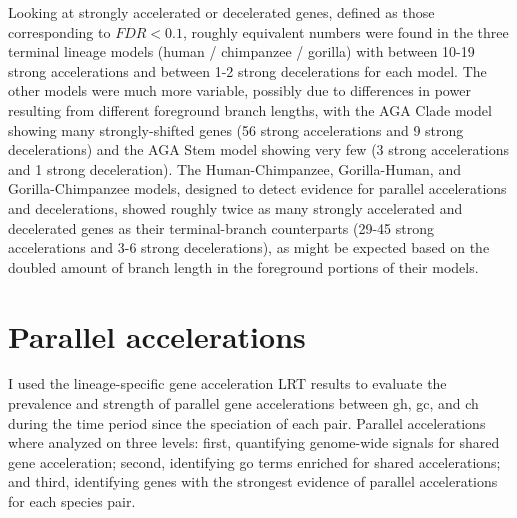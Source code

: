 Looking at strongly accelerated or decelerated genes, defined as those
corresponding to $FDR<0.1$, roughly equivalent numbers were found in
the three terminal lineage models (human / chimpanzee / gorilla) with
between 10-19 strong accelerations and between 1-2 strong
decelerations for each model. The other models were much more
variable, possibly due to differences in power resulting from
different foreground branch lengths, with the AGA Clade model showing
many strongly-shifted genes (56 strong accelerations and 9 strong
decelerations) and the AGA Stem model showing very few (3 strong
accelerations and 1 strong deceleration). The Human-Chimpanzee,
Gorilla-Human, and Gorilla-Chimpanzee models, designed to detect
evidence for parallel accelerations and decelerations, showed roughly
twice as many strongly accelerated and decelerated genes as their
terminal-branch counterparts (29-45 strong accelerations and 3-6
strong decelerations), as might be expected based on the doubled
amount of branch length in the foreground portions of their models.

\section{Parallel accelerations}
\label{sec_parallel_accel}

I used the lineage-specific gene acceleration LRT results to evaluate
the prevalence and strength of parallel gene accelerations between
\ac{gh}, \ac{gc}, and \ac{ch} during the time period since the
speciation of each pair. Parallel accelerations where analyzed on
three levels: first, quantifying genome-wide signals for shared gene
acceleration; second, identifying \ac{go} terms enriched for shared
accelerations; and third, identifying genes with the strongest
evidence of parallel accelerations for each species pair.

